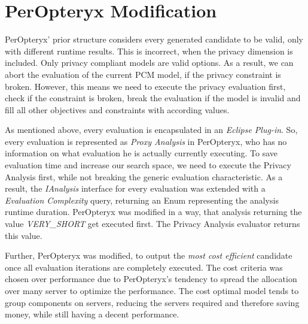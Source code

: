 \section{PerOpteryx Modification}

PerOpteryx' prior structure considers every generated candidate to be valid, only with different runtime results. This is incorrect, when the privacy dimension is included. Only privacy compliant models are valid options. As a result, we can abort the evaluation of the current PCM model, if the privacy constraint is broken. However, this means we need to execute the privacy evaluation first, check if the constraint is broken, break the evaluation if the model is invalid and fill all other objectives and constraints with according values.

As mentioned above, every evaluation is encapsulated in an \textit{Eclipse Plug-in}. So, every evaluation is represented as \textit{Proxy Analysis} in PerOpteryx, who has no information on what evaluation he is actually currently executing. To save evaluation time and increase our search space, we need to execute the Privacy Analysis first, while not breaking the generic evaluation characteristic. As a result, the \textit{IAnalysis} interface for every evaluation was extended with a \textit{Evaluation Complexity} query, returning an Enum representing the analysis runtime duration. PerOpteryx was modified in a way, that analysis returning the value \textit{VERY\_SHORT} get executed first. The Privacy Analysis evaluator returns this value.

Further, PerOpteryx was modified, to output the \textit{most cost efficient} candidate once all evaluation iterations are completely executed. The cost criteria was chosen over performance due to PerOpteryx's tendency to spread the allocation over many server to optimize the performance. The cost optimal model tends to group components on servers, reducing the servers required and therefore saving money, while still having a decent performance.


 

